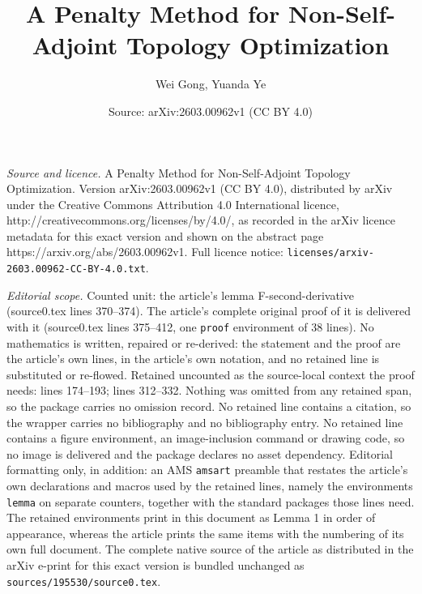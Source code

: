 \documentclass[10pt,a4paper]{amsart}
\title{A Penalty Method for Non-Self-Adjoint Topology Optimization}
\author{Wei Gong, Yuanda Ye}
\date{Source: arXiv:2603.00962v1 (CC BY 4.0)}
\begin{document}
\maketitle

\noindent\emph{Source and licence.} A Penalty Method for Non-Self-Adjoint Topology Optimization. Version arXiv:2603.00962v1 (CC BY 4.0), distributed by arXiv under the Creative Commons Attribution 4.0 International licence, http://creativecommons.org/licenses/by/4.0/, as recorded in the arXiv licence metadata for this exact version and shown on the abstract page https://arxiv.org/abs/2603.00962v1. Full licence notice: \texttt{licenses/arxiv-2603.00962-CC-BY-4.0.txt}.\par\smallskip

\noindent\textit{Editorial scope.} Counted unit: the article's lemma F-second-derivative (source0.tex lines 370--374). The article's complete original proof of it is delivered with it (source0.tex lines 375--412, one \texttt{proof} environment of 38 lines). No mathematics is written, repaired or re-derived: the statement and the proof are the article's own lines, in the article's own notation, and no retained line is substituted or re-flowed.  Retained uncounted as the source-local context the proof needs: lines 174--193; lines 312--332.  Nothing was omitted from any retained span, so the package carries no omission record.  No retained line contains a citation, so the wrapper carries no bibliography and no bibliography entry.  No retained line contains a figure environment, an image-inclusion command or drawing code, so no image is delivered and the package declares no asset dependency.  Editorial formatting only, in addition: an AMS \texttt{amsart} preamble that restates the article's own declarations and macros used by the retained lines, namely the environments \texttt{lemma} on separate counters, together with the standard packages those lines need.  The retained environments print in this document as Lemma 1 in order of appearance, whereas the article prints the same items with the numbering of its own full document.  The complete native source of the article as distributed in the arXiv e-print for this exact version is bundled unchanged as \texttt{sources/195530/source0.tex}.
\end{document}
